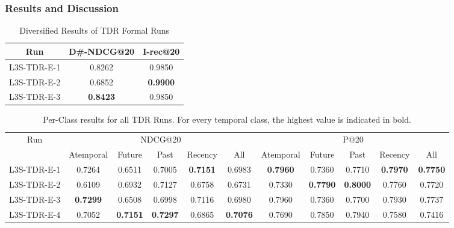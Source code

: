 \documentclass{sig-alternate}
\begin{document}
\subsubsection{Results and Discussion}
\label{results}
\begin{table}[htb]
\centering
\begin{tabular}{|c|c|c|}
\hline
Run & D\#-NDCG@20 & I-rec@20 \\
\hline
\hline
L3S-TDR-E-1 & 0.8262 & 0.9850 \\
\hline
L3S-TDR-E-2 & 0.6852 & \textbf{0.9900} \\
\hline
L3S-TDR-E-3 & \textbf{0.8423} & 0.9850 \\
\hline
\end{tabular}  
\caption{Diversified Results of TDR Formal Runs}
\label{table:3}
\end{table}
\begin{table*}[htb]
\begin{tabular}{ |c|c|c|c|c|c|c|c|c|c|c| }
 \hline
  \multirow{2}{*}{Run} & \multicolumn{5}{|c|}{NDCG@20} & \multicolumn{5}{|c|}{P@20}\\
  	\hhline{~----------}
    & Atemporal & Future & Past & Recency & All & Atemporal & Future & Past & Recency & All \\
    \hline
 \hline
 L3S-TDR-E-1 & 0.7264 & 0.6511 & 0.7005 & \textbf{0.7151} & 0.6983 & \textbf{0.7960} & 0.7360 & 0.7710 & \textbf{0.7970} & \textbf{0.7750}\\ 
 \hline
 L3S-TDR-E-2 & 0.6109 & 0.6932 & 0.7127 & 0.6758 & 0.6731 & 0.7330 & \textbf{0.7790} & \textbf{0.8000} & 0.7760 & 0.7720\\ 
 \hline
 L3S-TDR-E-3 & \textbf{0.7299} & 0.6508 & 0.6998 & 0.7116 & 0.6980 & 0.7960 & 0.7360 & 0.7700 & 0.7930 & 0.7737\\ 
 \hline
 L3S-TDR-E-4 & 0.7052 & \textbf{0.7151} & \textbf{0.7297} & 0.6865 & \textbf{0.7076} & 0.7690 & 0.7850 & 0.7940 & 0.7580 & 0.7416\\ 
 \hline
\end{tabular}
\caption{Per-Class results for all TDR Runs. For every temporal class, the highest value is indicated in bold.}
\label{table:2}
\end{table*}
\end{document}
